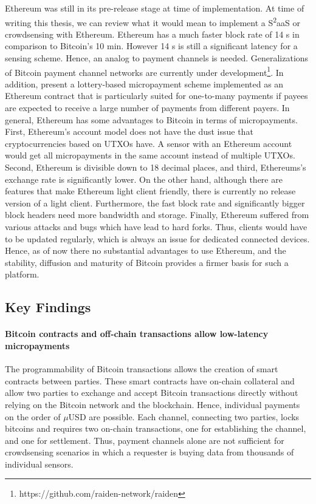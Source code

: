 Ethereum was still in its pre-release stage at time of implementation. At time of writing this thesis, we can review what it would mean to implement a S\textsuperscript{2}aaS or crowdsensing with Ethereum. Ethereum has a much faster block rate of 14 s in comparison to Bitcoin's 10 min. However 14 s is still a significant latency for a sensing scheme. Hence, an analog to payment channels is needed. Generalizations of Bitcoin payment channel networks are currently under development\footnote{https://github.com/raiden-network/raiden}. In addition, \cite{golemnano2015} present a lottery-based micropayment scheme implemented as an Ethereum contract that is particularly suited for one-to-many payments if payees are expected to receive a large number of payments from different payers.
In general, Ethereum has some advantages to Bitcoin in terms of micropayments. First, Ethereum's account model does not have the dust issue that cryptocurrencies based on \ac{UTXO}s have. A sensor with an Ethereum account would get all micropayments in the same account instead of multiple \ac{UTXO}s. Second, Ethereum is divisible down to 18 decimal places, and third, Ethereums's exchange rate is significantly lower. On the other hand, although there are features that make Ethereum light client friendly, there is currently no release version of a light client. Furthermore, the fast block rate and significantly bigger block headers need more bandwidth and storage. Finally, Ethereum suffered from various attacks and bugs which have lead to hard forks. Thus, clients would have to be updated regularly, which is always an issue for dedicated connected devices. 
Hence, as of now there no substantial advantages to use Ethereum, and the stability, diffusion and maturity of Bitcoin provides a firmer basis for such a platform.


\subsection{Key Findings}

\paragraph{Bitcoin contracts and off-chain transactions allow low-latency micropayments}

The programmability of Bitcoin transactions allows the creation of smart contracts between parties. These smart contracts have on-chain collateral and allow two parties to exchange and accept Bitcoin transactions directly without relying on the Bitcoin network and the blockchain. Hence, individual payments on the order of $\mu$USD are possible. Each channel, connecting two parties, locks bitcoins and requires two on-chain transactions, one for establishing the channel, and one for settlement. Thus, payment channels alone are not sufficient for crowdsensing scenarios in which a requester is buying data from thousands of individual sensors. 

